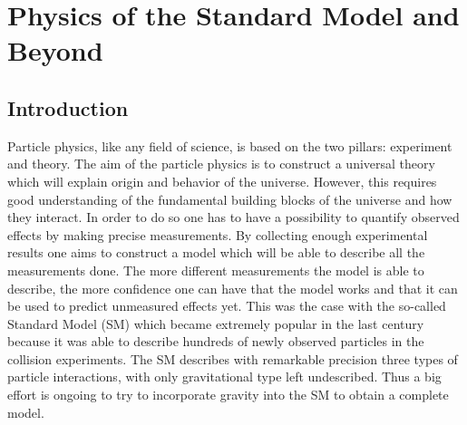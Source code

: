 \chapter{Physics of the Standard Model and Beyond}
\label{chap:Theory}



\section{Introduction}


Particle physics, like any field of science, is based on the two pillars: experiment and theory.
The aim of the particle physics is to construct a universal theory which will explain origin and behavior of the universe.
However, this requires good understanding of the fundamental building blocks of the universe and how they interact.
In order to do so one has to have a possibility to quantify observed effects by making precise measurements.
By collecting enough experimental results one aims to construct a model which will be able to describe all the measurements done. 
The more different measurements the model is able to describe, the more confidence one can have that the model works and that it can be used to predict 
unmeasured effects yet. This was the case with the so-called Standard Model (SM) which became extremely popular in the last century because
it was able to describe hundreds of newly observed particles in the collision experiments.
The SM describes with remarkable precision three types of particle interactions, with only gravitational type left undescribed.
Thus a big effort is ongoing to try to incorporate gravity into the SM to obtain a complete model.

